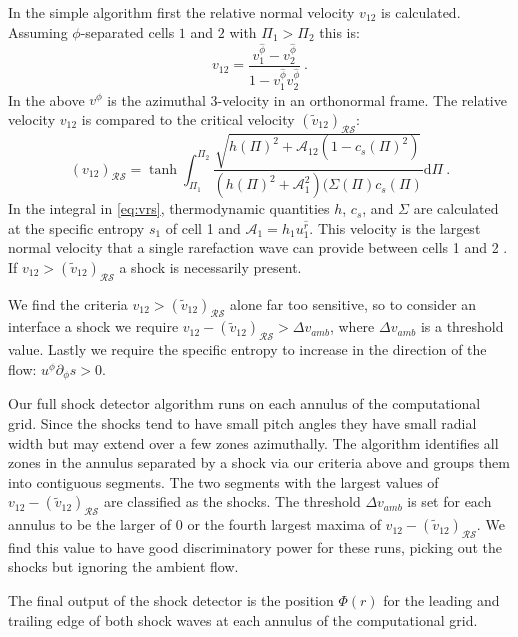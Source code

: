 \documentclass{emulateapj}
\newcommand{\Sig}{\Sigma}
\newcommand{\dd}{\mbox{d}}
\begin{document}
In the simple algorithm first the relative normal velocity $v_{12}$ is calculated.  Assuming $\phi$-separated cells $1$ and $2$ with $\Pi_1 > \Pi_2$ this is:
\begin{equation}
	v_{12} = \frac{v^{\hat{\phi}}_1 - v^{\hat{\phi}}_2}{1 - v^{\hat{\phi}}_1 v^{\hat{\phi}}_2} \ . \label{eq:vrel}
\end{equation}
In the above $v^{\hat{\phi}}$ is the azimuthal 3-velocity in an orthonormal frame. The relative velocity $v_{12}$ is compared to the critical velocity $(\tilde{v}_{12})_{\mathcal{R} \mathcal{S}}$:
\begin{equation}
	(v_{12})_{\mathcal{R}\mathcal{S}} = \tanh \int_{\Pi_1}^{\Pi_2} \frac{\sqrt{h(\Pi)^2 + \mathcal{A}_12(1-c_s(\Pi)^2)}}{(h(\Pi)^2 + \mathcal{A}_1^2)(\Sig(\Pi) c_s(\Pi)} \dd \Pi \ . \label{eq:vrs}
\end{equation}  
In the integral in \eqref{eq:vrs}, thermodynamic quantities $h$, $c_s$, and $\Sig$ are calculated at the specific entropy $s_1$ of cell 1 and $\mathcal{A}_1 = h_1 u_1^{\hat{r}}$.  This velocity is the largest normal velocity that a single rarefaction wave can provide between cells 1 and 2    \citep{Rezzolla03}.  If $v_{12} > (\tilde{v}_{12})_{\mathcal{R}\mathcal{S}}$ a shock is necessarily present.

We find the criteria $v_{12} > (\tilde{v}_{12})_{\mathcal{R}\mathcal{S}}$ alone far too sensitive, so to consider an interface a shock we require $v_{12} - (\tilde{v}_{12})_{\mathcal{R}\mathcal{S}} > \Delta v_{amb}$, where $\Delta v_{amb}$ is a threshold value.  Lastly we require the specific entropy to increase in the direction of the flow: $u^\phi \partial_\phi s > 0$.

Our full shock detector algorithm runs on each annulus of the computational grid.  Since the shocks tend to have small pitch angles they have small radial width but may extend over a few zones azimuthally.  The algorithm identifies all zones in the annulus separated by a shock via our criteria above and groups them into contiguous segments.  The two segments with the largest values of $v_{12} -  (\tilde{v}_{12})_{\mathcal{R}\mathcal{S}} $ are classified as the shocks. The threshold $\Delta v_{amb}$ is set for each annulus to be the larger of $0$ or the fourth largest maxima of $v_{12} -  (\tilde{v}_{12})_{\mathcal{R}\mathcal{S}} $. We find this value to have good discriminatory power for these runs, picking out the shocks but ignoring the ambient flow.

The final output of the shock detector is the position $\Phi(r)$ for the leading and trailing edge of both shock waves at each annulus of the computational grid.
\end{document}
